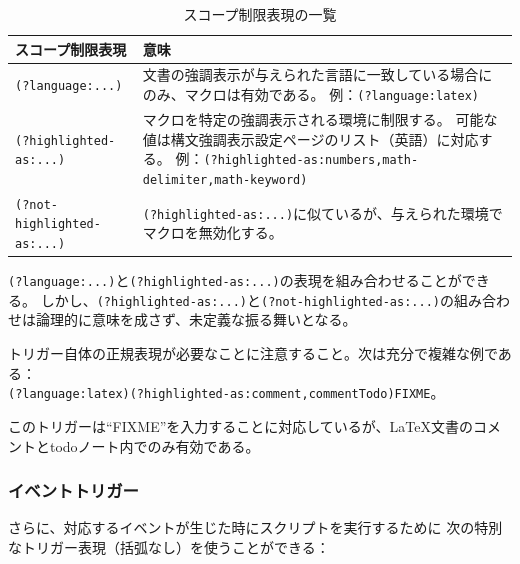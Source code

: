 \begin{table}[H]
  \centering
  \caption{スコープ制限表現の一覧}
  \begin{tabularx}{\linewidth}{lX}
    \hline
    \textbf{スコープ制限表現} & \textbf{意味}\\
    \hline
    \verb+(?language:...)+ & 文書の強調表示が与えられた言語に一致している場合にのみ、マクロは有効である。
      例：\verb+(?language:latex)+\\
    \verb+(?highlighted-as:...)+ & マクロを特定の強調表示される環境に制限する。
      可能な値は構文強調表示設定ページのリスト（英語）に対応する。
      例：\verb+(?highlighted-as:numbers,math-delimiter,math-keyword)+\\
    \verb+(?not-highlighted-as:...)+
      & \verb+(?highlighted-as:...)+に似ているが、与えられた環境でマクロを無効化する。\\
    \hline
  \end{tabularx}
\end{table}

\verb+(?language:...)+と\verb+(?highlighted-as:...)+の表現を組み合わせることができる。
しかし、\verb+(?highlighted-as:...)+と\verb+(?not-highlighted-as:...)+の組み合わせは論理的に意味を成さず、未定義な振る舞いとなる。

トリガー自体の正規表現が必要なことに注意すること。次は充分で複雑な例である：\\ \verb+(?language:latex)(?highlighted-as:comment,commentTodo)FIXME+。

このトリガーは``FIXME''を入力することに対応しているが、LaTeX文書のコメントとtodoノート内でのみ有効である。

\subsubsection{イベントトリガー}

さらに、対応するイベントが生じた時にスクリプトを実行するために
次の特別なトリガー表現（括弧なし）を使うことができる：

